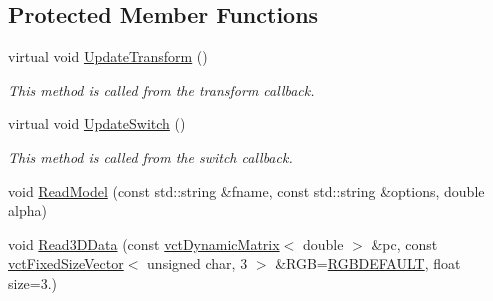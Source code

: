 \subsection*{Protected Member Functions}
\begin{DoxyCompactItemize}
\item 
virtual void \hyperlink{classosa_o_s_g_body_a0a6393b83c9dfb70997747df6a24aa0d}{Update\+Transform} ()
\begin{DoxyCompactList}\small\item\em This method is called from the transform callback. \end{DoxyCompactList}\item 
virtual void \hyperlink{classosa_o_s_g_body_aa1a1fa50eb0ee7f81b98fb235b3a33a1}{Update\+Switch} ()
\begin{DoxyCompactList}\small\item\em This method is called from the switch callback. \end{DoxyCompactList}\item 
void \hyperlink{classosa_o_s_g_body_a0c91a646007c34bd58abc87ee73634c1}{Read\+Model} (const std\+::string \&fname, const std\+::string \&options, double alpha)
\item 
void \hyperlink{classosa_o_s_g_body_adae2c975d0e59a663d3345a33d34dc09}{Read3\+D\+Data} (const \hyperlink{classvct_dynamic_matrix}{vct\+Dynamic\+Matrix}$<$ double $>$ \&pc, const \hyperlink{classvct_fixed_size_vector}{vct\+Fixed\+Size\+Vector}$<$ unsigned char, 3 $>$ \&R\+G\+B=\hyperlink{classosa_o_s_g_body_a1fb439b90b8d0277e28240e35de006dd}{R\+G\+B\+D\+E\+F\+A\+U\+L\+T}, float size=3.)
\end{DoxyCompactItemize}
